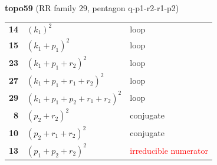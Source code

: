 \documentclass[10pt]{article}
\begin{document}
\begin{minipage}[t]{0.48\textwidth}
{}\\[2mm]\textbf{topo59} (RR family 29, pentagon q-p1-r2-r1-p2)\\[2pt]{\footnotesize\begin{tabular}{@{}r@{\ \ }l@{\ \ }l@{}}\textbf{14} & $(k_1)^2$ & loop\\
\textbf{15} & $(k_1+p_1)^2$ & loop\\
\textbf{23} & $(k_1+p_1+r_2)^2$ & loop\\
\textbf{27} & $(k_1+p_1+r_1+r_2)^2$ & loop\\
\textbf{29} & $(k_1+p_1+p_2+r_1+r_2)^2$ & loop\\
\textbf{8} & $(p_2+r_2)^2$ & conjugate\\
\textbf{10} & $(p_2+r_1+r_2)^2$ & conjugate\\
\textbf{13} & $(p_1+p_2+r_2)^2$ & \textcolor{red}{irreducible numerator}\\\end{tabular}}\end{minipage}\hfill%
\end{document}
